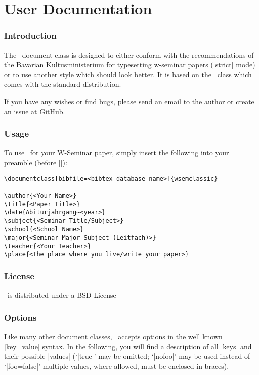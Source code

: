 \part{User Documentation}


\section{Introduction}

The \wsemclassic\ document class is designed to either conform with the
recommendations of the Bavarian Kultusministerium for typesetting
w-seminar papers (\hyperlink{udoc.opt.strict}{|strict|} mode) or to use another
style which should look better. It is based on the \report\ class which
comes with the standard  distribution.

If you have any wishes or find bugs, please send an email to the author or
\href{https://github.com/jorsn/wsemclassic/issues}{create an issue at GitHub}.


\section{Usage}

To use \wsemclassic\ for your W-Seminar paper, simply insert the following into your
 preamble (before ||):

\begin{verbatim}
\documentclass[bibfile=<bibtex database name>]{wsemclassic}

\author{<Your Name>}
\title{<Paper Title>}
\date{Abiturjahrgang~<year>}
\subject{<Seminar Title/Subject>}
\school{<School Name>}
\major{<Seminar Major Subject (Leitfach)>}
\teacher{<Your Teacher>}
\place{<The place where you live/write your paper>}
\end{verbatim}


\section{License}

\wsemclassic\ is distributed under a BSD License

\hypertarget{sec.options}{\section{Options}}

Like many other  document classes, \wsemclassic\ accepts options in
the well known |key=value| syntax. In the following, you will find a
description of all |keys| and their possible |values|
(`|true|' may be omitted; `|nofoo|' may be used instead of `|foo=false|' multiple
values, where allowed, must be enclosed in braces).

